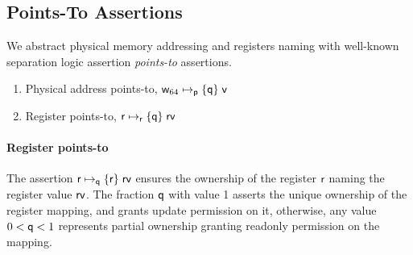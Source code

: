 \subsection{Points-To Assertions}
\label{sec:pointsto}
We abstract physical memory addressing and registers naming with well-known separation logic assertion \textit{points-to} assertions.
\begin{enumerate}
\item Physical address points-to, $\mathsf{w}_{64}\mapsto_{\mathsf{p}}\{\mathsf{q}\}\;\mathsf{v}$
\item Register points-to, $\mathsf{r}\mapsto_{\mathsf{r}}\{\mathsf{q}\}\;\mathsf{rv}$
\end{enumerate}
\paragraph{Register points-to} The assertion $\mathsf{r}\mapsto_{\mathsf{q}}\{\mathsf{r}\}\;\mathsf{rv}$ ensures the ownership of the register $\mathsf{r}$ naming the register value $\mathsf{rv}$. The fraction $\mathsf{q}$ with value 1 asserts the unique ownership of the register mapping, and grants update permission on it, otherwise, any value $0 < \mathsf{q} <1$ represents partial ownership granting readonly permission on the mapping.
